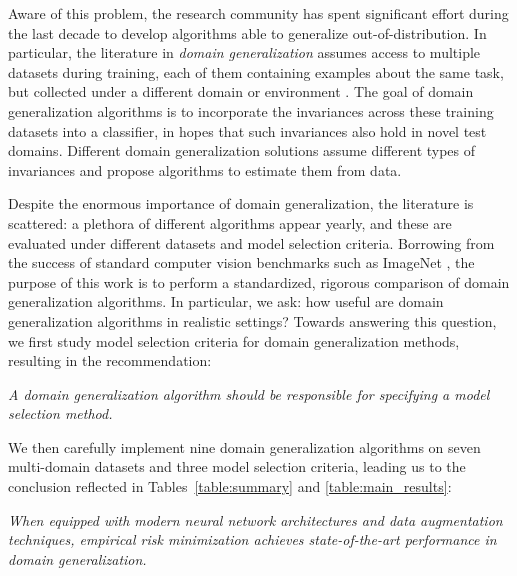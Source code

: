 \documentclass{article}
\begin{document}
Aware of this problem, the research community has spent significant effort during the last decade to develop algorithms able to generalize out-of-distribution.
In particular, the literature in \emph{domain generalization} assumes access to multiple datasets during training, each of them containing examples about the same task, but collected under a different domain or environment \citep{blanchard2011generalizing, muandet2013domain}. 
The goal of domain generalization algorithms is to incorporate the invariances across these training datasets into a classifier, in hopes that such invariances also hold in novel test domains.
Different domain generalization solutions assume different types of invariances and propose algorithms to estimate them from data.

Despite the enormous importance of domain generalization, the literature is scattered: a plethora of different algorithms appear yearly, and these are evaluated under different datasets and model selection criteria.
Borrowing from the success of standard computer vision benchmarks such as ImageNet \citep{russakovsky2015ImageNet}, the purpose of this work is to perform a standardized, rigorous comparison of domain generalization algorithms.
In particular, we ask: how useful are domain generalization algorithms in realistic settings?
Towards answering this question, we first study model selection criteria for domain generalization methods, resulting in the recommendation: 
\begin{center}
    \textit{A domain generalization algorithm should be responsible for specifying a model selection method.}
\end{center}
We then carefully implement nine domain generalization algorithms on seven multi-domain datasets and three model selection criteria, leading us to the conclusion reflected in Tables~\ref{table:summary} and \ref{table:main_results}:
\begin{center}
    \textit{When equipped with modern neural network architectures and data augmentation techniques, empirical risk minimization achieves state-of-the-art performance in domain generalization.}
\end{center}
\end{document}
